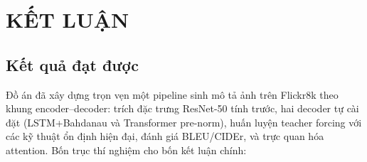 \chapter{KẾT LUẬN}
\label{chap:conclusion}

\section{Kết quả đạt được}

Đồ án đã xây dựng trọn vẹn một pipeline sinh mô tả ảnh trên Flickr8k theo khung
encoder--decoder: trích đặc trưng ResNet-50 tính trước, hai decoder tự cài đặt
(LSTM+Bahdanau và Transformer pre-norm), huấn luyện teacher forcing với các kỹ
thuật ổn định hiện đại, đánh giá BLEU/CIDEr, và trực quan hóa attention.
Bốn trục thí nghiệm cho bốn kết luận chính:

